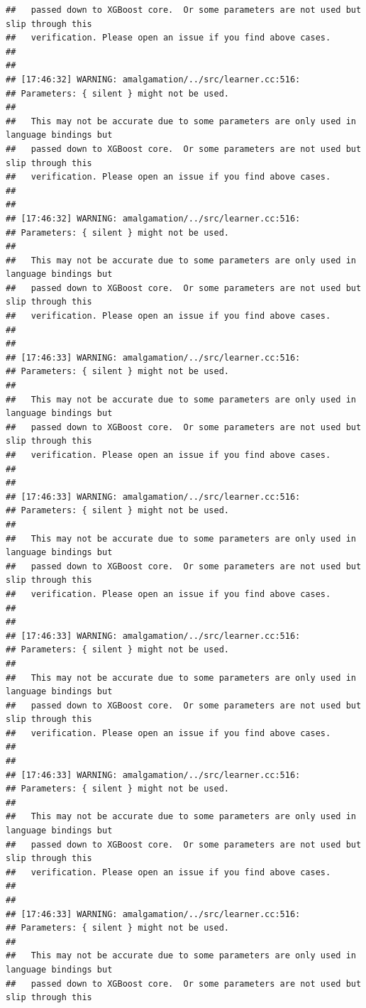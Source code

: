 \documentclass[AMS,STIX2COL]{WileyNJD-v2}\usepackage[]{graphicx}\usepackage[]{color}
\makeatletter
\newenvironment{kframe}{%
 \def\at@end@of@kframe{}%
 \ifinner\ifhmode%
  \def\at@end@of@kframe{\end{minipage}}%
  \begin{minipage}{\columnwidth}%
 \fi\fi%
 \def\FrameCommand##1{\hskip\@totalleftmargin \hskip-\fboxsep
 \colorbox{shadecolor}{##1}\hskip-\fboxsep
     \hskip-\linewidth \hskip-\@totalleftmargin \hskip\columnwidth}%
 \MakeFramed {\advance\hsize-\width
   \@totalleftmargin\z@ \linewidth\hsize
   \@setminipage}}%
 {\par\unskip\endMakeFramed%
 \at@end@of@kframe}
\newenvironment{knitrout}{}{} %
\makeatother
\begin{document}
\begin{knitrout}
\begin{kframe}
\begin{verbatim}
##   passed down to XGBoost core.  Or some parameters are not used but slip through this
##   verification. Please open an issue if you find above cases.
## 
## 
## [17:46:32] WARNING: amalgamation/../src/learner.cc:516: 
## Parameters: { silent } might not be used.
## 
##   This may not be accurate due to some parameters are only used in language bindings but
##   passed down to XGBoost core.  Or some parameters are not used but slip through this
##   verification. Please open an issue if you find above cases.
## 
## 
## [17:46:32] WARNING: amalgamation/../src/learner.cc:516: 
## Parameters: { silent } might not be used.
## 
##   This may not be accurate due to some parameters are only used in language bindings but
##   passed down to XGBoost core.  Or some parameters are not used but slip through this
##   verification. Please open an issue if you find above cases.
## 
## 
## [17:46:33] WARNING: amalgamation/../src/learner.cc:516: 
## Parameters: { silent } might not be used.
## 
##   This may not be accurate due to some parameters are only used in language bindings but
##   passed down to XGBoost core.  Or some parameters are not used but slip through this
##   verification. Please open an issue if you find above cases.
## 
## 
## [17:46:33] WARNING: amalgamation/../src/learner.cc:516: 
## Parameters: { silent } might not be used.
## 
##   This may not be accurate due to some parameters are only used in language bindings but
##   passed down to XGBoost core.  Or some parameters are not used but slip through this
##   verification. Please open an issue if you find above cases.
## 
## 
## [17:46:33] WARNING: amalgamation/../src/learner.cc:516: 
## Parameters: { silent } might not be used.
## 
##   This may not be accurate due to some parameters are only used in language bindings but
##   passed down to XGBoost core.  Or some parameters are not used but slip through this
##   verification. Please open an issue if you find above cases.
## 
## 
## [17:46:33] WARNING: amalgamation/../src/learner.cc:516: 
## Parameters: { silent } might not be used.
## 
##   This may not be accurate due to some parameters are only used in language bindings but
##   passed down to XGBoost core.  Or some parameters are not used but slip through this
##   verification. Please open an issue if you find above cases.
## 
## 
## [17:46:33] WARNING: amalgamation/../src/learner.cc:516: 
## Parameters: { silent } might not be used.
## 
##   This may not be accurate due to some parameters are only used in language bindings but
##   passed down to XGBoost core.  Or some parameters are not used but slip through this

\end{verbatim}
\end{kframe}
\end{knitrout}
\end{document}
